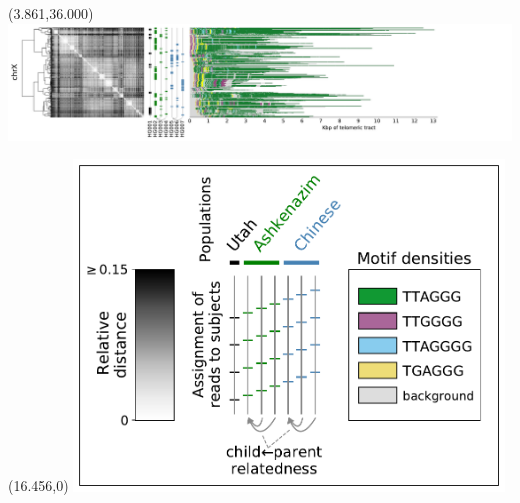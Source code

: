 \documentclass{article}
\begin{document}
\begin{textblock}{13}(3.861,36.000)\includegraphics{haplotypes/chrX.pdf}\end{textblock}
\begin{textblock}{13}(16.456,0)
\includegraphics[width=4.500in,keepaspectratio]{haplotypes/haplotypes-legend.pdf}
\end{textblock}
\end{document}
